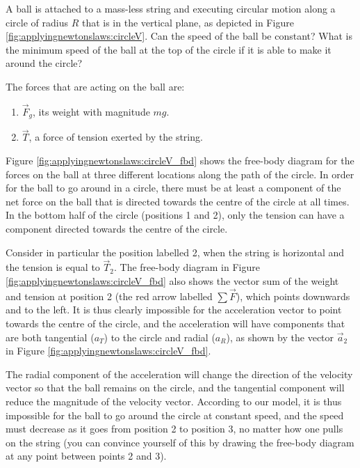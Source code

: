 \begin{example}{
A ball is attached to a mass-less string and executing circular motion along a circle of radius $R$ that is in the vertical plane, as depicted in Figure \ref{fig:applyingnewtonslaws:circleV}. Can the speed of the ball be constant? What is the minimum speed of the ball at the top of the circle if it is able to make it around the circle?}

The forces that are acting on the ball are:
\begin{enumerate}
\item $\vec F_g$, its weight with magnitude $mg$.
\item $\vec T$, a force of tension exerted by the string.
\end{enumerate}
Figure \ref{fig:applyingnewtonslaws:circleV_fbd} shows the free-body diagram for the forces on the ball at three different locations along the path of the circle.
In order for the ball to go around in a circle, there must be at least a component of the net force on the ball that is directed towards the centre of the circle at all times. In the bottom half of the circle (positions 1 and 2), only the tension can have a component directed towards the centre of the circle.

Consider in particular the position labelled 2, when the string is horizontal and the tension is equal to $\vec T_2$. The free-body diagram in Figure \ref{fig:applyingnewtonslaws:circleV_fbd} also shows the vector sum of the weight and tension at position 2 (the red arrow labelled $\sum \vec F$), which points downwards and to the left. It is thus clearly impossible for the acceleration vector to point towards the centre of the circle, and the acceleration will have components that are both tangential ($a_T$) to the circle and radial ($a_R$), as shown by the vector $\vec a_2$ in Figure \ref{fig:applyingnewtonslaws:circleV_fbd}.

The radial component of the acceleration will change the direction of the velocity vector so that the ball remains on the circle, and the tangential component will reduce the magnitude of the velocity vector. According to our model, it is thus impossible for the ball to go around the circle at constant speed, and the speed must decrease as it goes from position 2 to position 3, no matter how one pulls on the string (you can convince yourself of this by drawing the free-body diagram at any point between points 2 and 3). 


\end{example}
